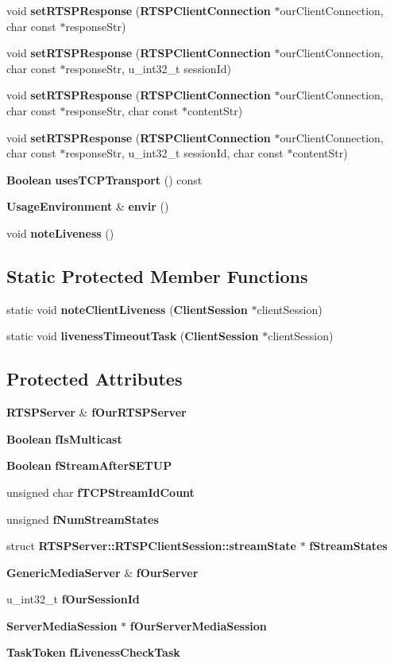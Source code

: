\begin{DoxyCompactItemize}
\item 
void {\bf set\+R\+T\+S\+P\+Response} ({\bf R\+T\+S\+P\+Client\+Connection} $\ast$our\+Client\+Connection, char const $\ast$response\+Str)
\item 
void {\bf set\+R\+T\+S\+P\+Response} ({\bf R\+T\+S\+P\+Client\+Connection} $\ast$our\+Client\+Connection, char const $\ast$response\+Str, u\+\_\+int32\+\_\+t session\+Id)
\item 
void {\bf set\+R\+T\+S\+P\+Response} ({\bf R\+T\+S\+P\+Client\+Connection} $\ast$our\+Client\+Connection, char const $\ast$response\+Str, char const $\ast$content\+Str)
\item 
void {\bf set\+R\+T\+S\+P\+Response} ({\bf R\+T\+S\+P\+Client\+Connection} $\ast$our\+Client\+Connection, char const $\ast$response\+Str, u\+\_\+int32\+\_\+t session\+Id, char const $\ast$content\+Str)
\item 
{\bf Boolean} {\bf uses\+T\+C\+P\+Transport} () const 
\item 
{\bf Usage\+Environment} \& {\bf envir} ()
\item 
void {\bf note\+Liveness} ()
\end{DoxyCompactItemize}
\subsection*{Static Protected Member Functions}
\begin{DoxyCompactItemize}
\item 
static void {\bf note\+Client\+Liveness} ({\bf Client\+Session} $\ast$client\+Session)
\item 
static void {\bf liveness\+Timeout\+Task} ({\bf Client\+Session} $\ast$client\+Session)
\end{DoxyCompactItemize}
\subsection*{Protected Attributes}
\begin{DoxyCompactItemize}
\item 
{\bf R\+T\+S\+P\+Server} \& {\bf f\+Our\+R\+T\+S\+P\+Server}
\item 
{\bf Boolean} {\bf f\+Is\+Multicast}
\item 
{\bf Boolean} {\bf f\+Stream\+After\+S\+E\+T\+U\+P}
\item 
unsigned char {\bf f\+T\+C\+P\+Stream\+Id\+Count}
\item 
unsigned {\bf f\+Num\+Stream\+States}
\item 
struct {\bf R\+T\+S\+P\+Server\+::\+R\+T\+S\+P\+Client\+Session\+::stream\+State} $\ast$ {\bf f\+Stream\+States}
\item 
{\bf Generic\+Media\+Server} \& {\bf f\+Our\+Server}
\item 
u\+\_\+int32\+\_\+t {\bf f\+Our\+Session\+Id}
\item 
{\bf Server\+Media\+Session} $\ast$ {\bf f\+Our\+Server\+Media\+Session}
\item 
{\bf Task\+Token} {\bf f\+Liveness\+Check\+Task}
\end{DoxyCompactItemize}
